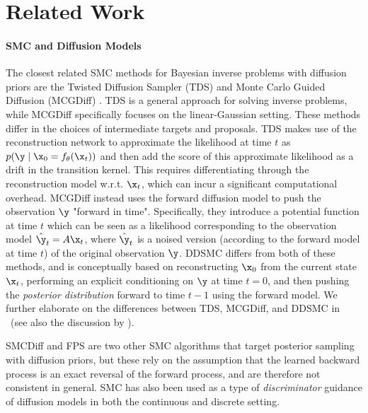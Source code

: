 \section{Related Work}
\label{sec:related_work}
\paragraph{SMC and Diffusion Models} 
The closest related SMC methods for Bayesian inverse problems with diffusion priors are the Twisted Diffusion Sampler (TDS) \citep{wu_practical_2023} and Monte Carlo Guided Diffusion (MCGDiff) \citep{cardoso_monte_2023-2}. TDS is a general approach for solving inverse problems, while MCGDiff specifically focuses on the linear-Gaussian setting. These methods differ in the choices of intermediate targets and proposals.
TDS makes use of the reconstruction network to approximate the likelihood at time $t$ as $p(\y \mid \x_0 = f_\theta(\x_{t}))$ and then add the score of this approximate likelihood as a drift in the transition kernel. This requires differentiating through the reconstruction model w.r.t. $\x_{t}$, which can incur a significant computational overhead. MCGDiff instead uses the forward diffusion model to push the observation $\y$ "forward in time". Specifically, they introduce a potential function at time $t$ which can be seen as a likelihood corresponding to the observation model $\hat \y_t = A\x_t$, where $\hat \y_t$ is a noised version (according to the forward model at time $t$) of the original observation $\y$. 
DDSMC differs from both of these methods, and is conceptually based on reconstructing $\x_0$ from the current state $\x_t$, performing an explicit conditioning on $\y$ at time $t=0$, and then pushing the \emph{posterior distribution} forward to time $t-1$ using the forward model.
We further elaborate on the differences between TDS, MCGDiff, and DDSMC in ~(see also the discussion by \citet{Zhao2024rsta}). 

SMCDiff \citep{trippe_diffusion_2023} and FPS \citep{dou_diffusion_2023-1} are two other SMC algorithms that target posterior sampling with diffusion priors, but these rely on the assumption that the learned backward process is an exact reversal of the forward process, and are therefore not consistent in general. SMC has also been used as a type of \emph{discriminator} guidance \cite{kim_refining_2023-1} of diffusion models in both the continuous \cite{liu_correcting_2024} and discrete \cite{ekstrom_kelvinius_discriminator_2024} setting.

